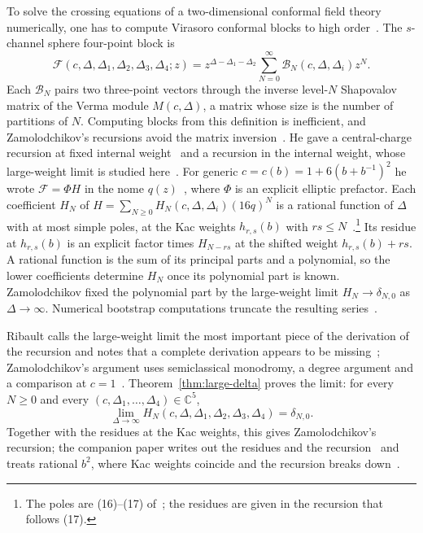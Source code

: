 \documentclass[twoside,10pt]{article}
\numberwithin{equation}{section}
\theoremstyle{slbody}
\theoremstyle{definition}
\theoremstyle{remark}
\begin{document}
To solve the crossing equations of a two-dimensional conformal field theory
numerically, one has to compute Virasoro conformal blocks to high
order~\cite[\S4.3]{Ribault2026}.  The \(s\)-channel sphere four-point block is
\[
 \mathcal F(c,\Delta,\Delta_1,\Delta_2,\Delta_3,\Delta_4;z)
 =z^{\Delta-\Delta_1-\Delta_2}\sum_{N=0}^\infty\mathcal B_N(c,\Delta,\Delta_i)z^N.
\]
Each \(\mathcal B_N\) pairs two three-point vectors through the inverse
level-\(N\) Shapovalov matrix of the Verma module \(M(c,\Delta)\), a matrix
whose size is the number of partitions of \(N\).  Computing blocks from this
definition is inefficient, and Zamolodchikov's recursions avoid the matrix
inversion~\cite[\S4.3]{Ribault2026}.  He gave a central-charge recursion at
fixed internal weight~\cite[(8)]{Zamolodchikov1984} and a recursion in the
internal weight, whose large-weight limit is studied here~\cite{Zamolodchikov1987}.  For
generic \(c=c(b)=1+6(b+b^{-1})^2\) he wrote \(\mathcal F=\Phi H\) in the nome
\(q(z)\)~\cite[(5)--(6)]{Zamolodchikov1987}, where \(\Phi\) is an explicit
elliptic prefactor.  Each coefficient \(H_N\) of
\(H=\sum_{N\geq0}H_N(c,\Delta,\Delta_i)(16q)^N\) is a rational function of
\(\Delta\) with at most simple poles, at the Kac weights \(h_{r,s}(b)\) with
\(rs\leq N\)~\cite[\S3]{Zamolodchikov1987}.\footnote{The poles are (16)--(17) of~\cite{Zamolodchikov1987}; the residues are given in the recursion that follows (17).}
Its residue at \(h_{r,s}(b)\) is an explicit factor times \(H_{N-rs}\) at the
shifted weight \(h_{r,s}(b)+rs\).  A rational function is the sum of
its principal parts and a polynomial, so the lower coefficients determine
\(H_N\) once its polynomial part is known.  Zamolodchikov fixed the polynomial
part by the large-weight limit \(H_N\to\delta_{N,0}\) as \(\Delta\to\infty\).
Numerical bootstrap computations truncate the resulting
series~\cite[\S4.4.2]{Ribault2026}.

Ribault calls the large-weight limit the most important piece of the
derivation of the recursion and notes that a complete derivation appears to
be missing~\cite[\S4.3.4]{Ribault2026}; Zamolodchikov's argument uses
semiclassical monodromy, a degree argument and a comparison at
\(c=1\)~\cite{Zamolodchikov1987}.  Theorem~\ref{thm:large-delta} proves the
limit: for every \(N\geq0\) and every
\((c,\Delta_1,\dots,\Delta_4)\in\mathbb C^5\),
\[
 \lim_{\Delta\to\infty}H_N(c,\Delta,\Delta_1,\Delta_2,\Delta_3,\Delta_4)=\delta_{N,0}.
\]
Together with the residues at the Kac weights, this gives Zamolodchikov's
recursion; the companion paper writes out the residues and the
recursion~\cite[Proposition~12.4]{PolzerColliding2026}
and treats rational \(b^2\), where Kac weights coincide and the recursion
breaks down~\cite[\S4.3.3]{Ribault2026}.
\end{document}
